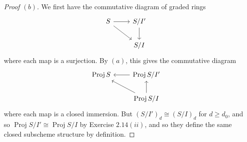 \documentclass[10pt]{article}
\theoremstyle{definition}
\theoremstyle{remark}
\numberwithin{equation}{section}
\numberwithin{figure}{subsubsection}
\DeclareMathOperator{\Proj}{Proj}
\begin{document}
\begin{proof}[Proof $(b)$]
  We first have the commutative diagram of graded rings
  \begin{equation*}
    \begin{tikzcd}
      S \rar\arrow{dr} & S/I'\dar\\
      & S/I
    \end{tikzcd}
  \end{equation*}
  where each map is a surjection. By $(a)$, this gives the commutative diagram
  \begin{equation*}
    \begin{tikzcd}
      \Proj S & \arrow{l} \Proj S/I'\\
      & \Proj S/I \arrow{ul}\uar
    \end{tikzcd}
  \end{equation*}
  where each map is a closed immersion. But $(S/I')_d \cong (S/I)_d$ for $d \ge
  d_0$, and so $\Proj S/I' \cong \Proj S/I$ by Exercise $2.14(ii)$, and so they define the same closed subscheme structure by definition.
\end{proof}
\end{document}
